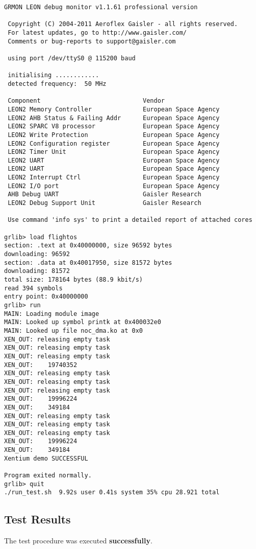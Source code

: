 \begin{Verbatim}[frame=single, rulecolor=\color{uvie-blue!75}]
 GRMON LEON debug monitor v1.1.61 professional version

 Copyright (C) 2004-2011 Aeroflex Gaisler - all rights reserved.
 For latest updates, go to http://www.gaisler.com/
 Comments or bug-reports to support@gaisler.com

 using port /dev/ttyS0 @ 115200 baud

 initialising ............
 detected frequency:  50 MHz

 Component                            Vendor
 LEON2 Memory Controller              European Space Agency
 LEON2 AHB Status & Failing Addr      European Space Agency
 LEON2 SPARC V8 processor             European Space Agency
 LEON2 Write Protection               European Space Agency
 LEON2 Configuration register         European Space Agency
 LEON2 Timer Unit                     European Space Agency
 LEON2 UART                           European Space Agency
 LEON2 UART                           European Space Agency
 LEON2 Interrupt Ctrl                 European Space Agency
 LEON2 I/O port                       European Space Agency
 AHB Debug UART                       Gaisler Research
 LEON2 Debug Support Unit             Gaisler Research

 Use command 'info sys' to print a detailed report of attached cores

grlib> load flightos
section: .text at 0x40000000, size 96592 bytes
downloading: 96592
section: .data at 0x40017950, size 81572 bytes
downloading: 81572
total size: 178164 bytes (88.9 kbit/s)
read 394 symbols
entry point: 0x40000000
grlib> run
MAIN: Loading module image
MAIN: Looked up symbol printk at 0x400032e0
MAIN: Looked up file noc_dma.ko at 0x0
XEN_OUT: releasing empty task
XEN_OUT: releasing empty task
XEN_OUT: releasing empty task
XEN_OUT: 	19740352
XEN_OUT: releasing empty task
XEN_OUT: releasing empty task
XEN_OUT: releasing empty task
XEN_OUT: 	19996224
XEN_OUT: 	349184
XEN_OUT: releasing empty task
XEN_OUT: releasing empty task
XEN_OUT: releasing empty task
XEN_OUT: 	19996224
XEN_OUT: 	349184
Xentium demo SUCCESSFUL

Program exited normally.
grlib> quit
./run_test.sh  9.92s user 0.41s system 35% cpu 28.921 total

\end{Verbatim}

\subsection*{Test Results}

The test procedure was executed \textbf{successfully}.



